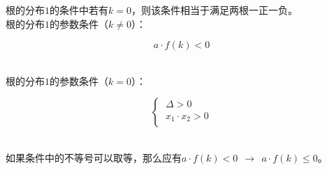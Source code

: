 \documentclass[UTF8]{ctexart}
\begin{document}
    根的分布$1$的条件中若有$k=0$，则该条件相当于满足两根一正一负。\\[3mm]
    根的分布$1$的参数条件（$k\neq 0$）：
    \begin{large}
        \begin{equation*}
            a\cdot f(k)<0
        \end{equation*}
    \end{large}\\
    根的分布$1$的参数条件（$k=0$）：
    \begin{large}
        \begin{equation*}
            \begin{cases}
                ~\Delta>0\\[1mm]
                ~x_1\cdot x_2>0\\[1mm]
            \end{cases}
        \end{equation*}
    \end{large}\\
    如果条件中的不等号可以取等，那么应有$a\cdot f(k)<0~~\longrightarrow~~a\cdot f(k)\leq 0$。

\newpage
\end{document}
